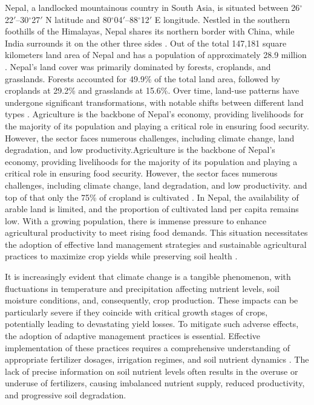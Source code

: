 Nepal, a landlocked mountainous country in South Asia, is situated between 26$^\circ$22$'$–30$^\circ$27$'$ N latitude and 80$^\circ$04$'$–88$^\circ$12$'$ E longitude. Nestled in the southern foothills of the Himalayas, Nepal shares its northern border with China, while India surrounds it on the other three sides \parencite{ningLandUseCover}. Out of the total 147,181 square kilometers land area of Nepal \parencite{timilsinaAGRICULTURELANDUSE2019} and has a population of approximately 28.9 million \parencite{ningLandUseCover}. Nepal's land cover was primarily dominated by forests, croplands, and grasslands. Forests accounted for 49.9\% of the total land area, followed by croplands at 29.2\% and grasslands at 15.6\%. Over time, land-use patterns have undergone significant transformations, with notable shifts between different land types \parencite{ningLandUseCover}. Agriculture is the backbone of Nepal's economy, providing livelihoods for the majority of its population and playing a critical role in ensuring food security. However, the sector faces numerous challenges, including climate change, land degradation, and low productivity.Agriculture is the backbone of Nepal's economy, providing livelihoods for the majority of its population and playing a critical role in ensuring food security. However, the sector faces numerous challenges, including climate change, land degradation, and low productivity. and top of that only the 75\% of cropland is cultivated \parencite{timilsinaAGRICULTURELANDUSE2019}. In Nepal, the availability of arable land is limited, and the proportion of cultivated land per capita remains low. With a growing population, there is immense pressure to enhance agricultural productivity to meet rising food demands. This situation necessitates the adoption of effective land management strategies and sustainable agricultural practices to maximize crop yields while preserving soil health \parencite{rawalSoilNutrientBalance2022}.

It is increasingly evident that climate change is a tangible phenomenon, with fluctuations in temperature and precipitation affecting nutrient levels, soil moisture conditions, and, consequently, crop production. These impacts can be particularly severe if they coincide with critical growth stages of crops, potentially leading to devastating yield losses. To mitigate such adverse effects, the adoption of adaptive management practices is essential. Effective implementation of these practices requires a comprehensive understanding of appropriate fertilizer dosages, irrigation regimes, and soil nutrient dynamics \parencite{shresthaAssessmentClimateChange2017}. The lack of precise information on soil nutrient levels often results in the overuse or underuse of fertilizers, causing imbalanced nutrient supply, reduced productivity, and progressive soil degradation.

